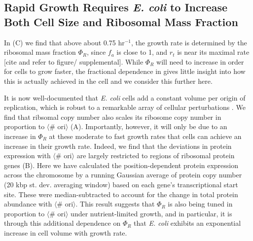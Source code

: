 \subsection{Rapid Growth Requires \textit{E. coli} to Increase Both Cell Size and Ribosomal
Mass Fraction}
In (C) we find that above about 0.75 hr$^{-1}$, the growth
rate is determined by the ribosomal mass fraction $\Phi_R$, since $f_a$ is close
to 1, and $r_t$ is near its maximal rate [cite and refer to figure/
supplemental]. While $\Phi_R$ will need to increase in order for cells to grow faster, the
fractional dependence in  gives little insight
into how this is actually achieved in the cell and we consider this further here.

It is now well-documented that \textit{E. coli} cells add a constant volume per
origin of replication, which is robust to a remarkable array of cellular
perturbations \citep{si2017}. We find that ribsomal copy number also scales its
ribosome copy number in proportion to $\langle$\# ori$\rangle$
(A). Importantly, however, it will only be due to
an increase in $\Phi_R$ at these moderate to fast growth rates that cells can
achieve an increase in their growth rate. Indeed, we find that the deviations in
protein expression with $\langle$\# ori$\rangle$ are largely restricted to
regions of ribosomal protein genes (B). Here we
have calculated the position-dependent protein expression across the chromosome
by a running Gaussian average of protein copy number (20 kbp st. dev. averaging
window) based on each gene's transcriptional start site. These were
median-subtracted to account for the change in total protein abundance with
$\langle$\# ori$\rangle$. This result suggests that $\Phi_R$ is also being tuned
in proportion to $\langle$\# ori$\rangle$ under nutrient-limited growth, and in
particular, it is through this additional dependence on $\Phi_R$ that \textit{E.
coli} exhibits an exponential increase in cell volume with growth rate.




